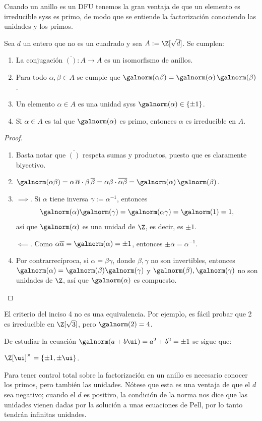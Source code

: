 \documentclass[11pt, reqno]{amsart}
\begin{document}
Cuando un anillo es un DFU tenemos la gran ventaja de que un elemento es irreducible syss es primo, de modo que se entiende la factorización
conociendo las unidades y los primos.
\begin{prop}
	Sea $d$ un entero que no es un cuadrado y sea $A := \Z[\sqrt{d}]$.
	Se cumplen:
	\begin{enumerate}
		\item La conjugación $\overline{()} \colon A \to A$ es un isomorfismo de anillos.
		\item Para todo $\alpha, \beta \in A$ se cumple que $\galnorm(\alpha \beta) = \galnorm(\alpha) \, \galnorm(\beta)$.
		\item Un elemento $\alpha \in A$ es una unidad syss $\galnorm(\alpha) \in \{ \pm 1 \}$.
		\item Si $\alpha \in A$ es tal que $\galnorm(\alpha)$ es primo, entonces $\alpha$ es irreducible en $A$.
	\end{enumerate}
\end{prop}
\begin{proof}
	\begin{enumerate}
		\item Basta  notar que $\overline{()}$ respeta sumas y productos, puesto que es claramente biyectivo.
		\item $\galnorm(\alpha \beta) = \alpha \, \overline{\alpha} \cdot \beta \, \overline{\beta} = \alpha \beta \cdot \overline{\alpha \beta}
			= \galnorm(\alpha) \, \galnorm(\beta)$.
		\item $\implies$. Si $\alpha$ tiene inversa $\gamma := \alpha^{-1}$, entonces
			\[
				\galnorm(\alpha) \galnorm(\gamma) = \galnorm(\alpha \gamma) = \galnorm(1) = 1,
			\]
			así que $\galnorm(\alpha)$ es una unidad de $\Z$, es decir, es $\pm 1$.

			$\impliedby$. Como $\alpha \overline{\alpha} = \galnorm(\alpha) = \pm 1$, entonces $\pm\overline{\alpha} = \alpha^{-1}$.
		\item Por contrarrecíproca, si $\alpha = \beta \gamma$, donde $\beta, \gamma$ no son invertibles, entonces
			$\galnorm(\alpha) = \galnorm(\beta) \galnorm(\gamma)$ y $\galnorm(\beta), \galnorm(\gamma)$ no son unidades de $\Z$,
			así que $\galnorm(\alpha)$ es compuesto. \qedhere
	\end{enumerate}
\end{proof}
El criterio del inciso 4 no es una equivalencia.
Por ejemplo, es fácil probar que 2 es irreducible en $\Z[\sqrt{3}]$, pero $\galnorm(2) = 4$.

De estudiar la ecuación $\galnorm(a + b\ui) = a^2 + b^2 = \pm 1$ se sigue que:
\begin{cor}
	$\Z[\ui]^\times = \{ \pm 1, \pm \ui \}$.
\end{cor}
Para tener control total sobre la factorización en un anillo es necesario conocer los primos, pero también las unidades.
Nótese que esta es una ventaja de que el $d$ sea negativo; cuando el $d$ es positivo, la condición de la norma nos dice que las
unidades vienen dadas por la solución a unas ecuaciones de Pell, por lo tanto tendrán infinitas unidades.
\end{document}
